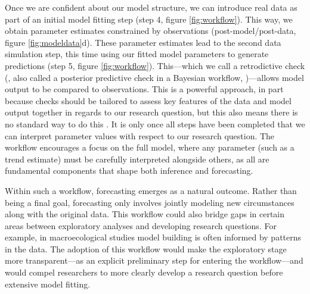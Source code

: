 \documentclass[11pt]{article}
\newcommand{\llabel}[1]{\hypertarget{lintarget:#1}{}\linelabel{lin:#1}}
\begin{document}
Once we are confident about our model structure, we can introduce real data as part of an initial model fitting step (step 4, figure \ref{fig:workflow}). This way, we obtain parameter estimates constrained by observations (\llabel{quad7}post-model/post-data, figure \ref{fig:modeldata}d). 
These parameter estimates lead to the second data simulation step, this time using our fitted model parameters to generate predictions (step 5, figure \ref{fig:workflow}). This---which we call a retrodictive check (\citealp{betanworkflow}, also called a \llabel{PPC}posterior predictive check in a Bayesian workflow,  \citealp{Gelman2020})---allows model output to be compared to observations. \llabel{howtoPPC}This is a powerful approach, in part because checks should be tailored to assess key features of the data and model output together in regards to our research question, but this also means there is no standard way to do this \citep{Gelman2020}.
It is only once all steps have been completed that we can interpret parameter values with respect to our research question.
The workflow encourages a focus on the full model, where any parameter (such as a trend estimate) must be carefully interpreted alongside others, as all are fundamental components that shape both inference and forecasting. 

Within such a workflow, forecasting emerges as a natural outcome. Rather than being a final goal, forecasting only involves jointly modeling new circumstances along with the original data. This workflow could also bridge gaps in certain areas between exploratory analyses and developing research questions. For example, in macroecological studies model building is often informed by patterns in the data. The adoption of this workflow would make the exploratory stage more transparent---as an explicit preliminary step for entering the workflow---and would compel researchers to more clearly develop a research question before extensive model fitting. %
\end{document}
